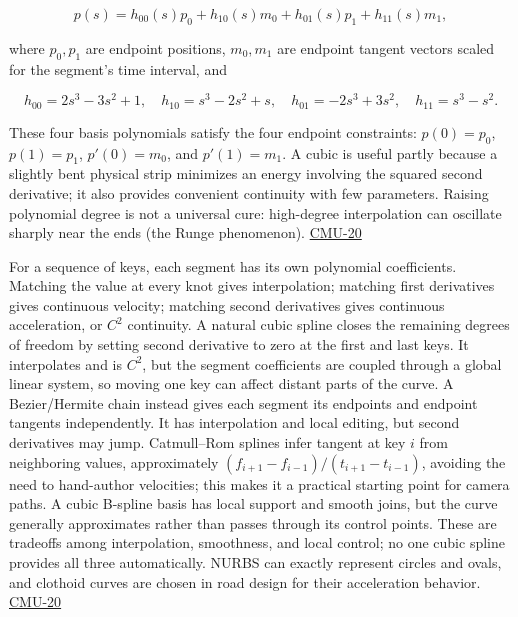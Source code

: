 \[
p(s)=h_{00}(s)p_0+h_{10}(s)m_0+h_{01}(s)p_1+h_{11}(s)m_1,
\]

where \(p_0,p_1\) are endpoint positions, \(m_0,m_1\) are endpoint tangent vectors scaled for the segment's time interval, and

\[
h_{00}=2s^3-3s^2+1,\quad h_{10}=s^3-2s^2+s,\quad h_{01}=-2s^3+3s^2,\quad h_{11}=s^3-s^2.
\]

These four basis polynomials satisfy the four endpoint constraints: \(p(0)=p_0\), \(p(1)=p_1\), \(p'(0)=m_0\), and \(p'(1)=m_1\). A cubic is useful partly because a slightly bent physical strip minimizes an energy involving the squared second derivative; it also provides convenient continuity with few parameters. Raising polynomial degree is not a universal cure: high-degree interpolation can oscillate sharply near the ends (the Runge phenomenon). \hyperref[04-visual-computing-ii-ch036]{CMU-20}

For a sequence of keys, each segment has its own polynomial coefficients. Matching the value at every knot gives interpolation; matching first derivatives gives continuous velocity; matching second derivatives gives continuous acceleration, or \(C^2\) continuity. A natural cubic spline closes the remaining degrees of freedom by setting second derivative to zero at the first and last keys. It interpolates and is \(C^2\), but the segment coefficients are coupled through a global linear system, so moving one key can affect distant parts of the curve. A Bezier/Hermite chain instead gives each segment its endpoints and endpoint tangents independently. It has interpolation and local editing, but second derivatives may jump. Catmull--Rom splines infer tangent at key \(i\) from neighboring values, approximately \((f_{i+1}-f_{i-1})/(t_{i+1}-t_{i-1})\), avoiding the need to hand-author velocities; this makes it a practical starting point for camera paths. A cubic B-spline basis has local support and smooth joins, but the curve generally approximates rather than passes through its control points. These are tradeoffs among interpolation, smoothness, and local control; no one cubic spline provides all three automatically. NURBS can exactly represent circles and ovals, and clothoid curves are chosen in road design for their acceleration behavior. \hyperref[04-visual-computing-ii-ch036]{CMU-20}

